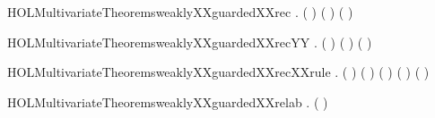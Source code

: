 \newcommand{\HOLMultivariateTheoremsweaklyXXguardedXXprefixXXrule}{\UseVerbatim{HOLMultivariateTheoremsweaklyXXguardedXXprefixXXrule}}
\begin{SaveVerbatim}{HOLMultivariateTheoremsweaklyXXguardedXXrec}
\HOLTokenTurnstile{} \HOLSymConst{\HOLTokenForall{}}  .
         (\HOLConst{\ensuremath{\mu}}  ) \HOLSymConst{\HOLTokenImp{}}
       \HOLSymConst{\HOLTokenNeg{}}   \HOLSymConst{\HOLTokenConj{}}  ( ) ( )
\end{SaveVerbatim}
\newcommand{\HOLMultivariateTheoremsweaklyXXguardedXXrec}{\UseVerbatim{HOLMultivariateTheoremsweaklyXXguardedXXrec}}
\begin{SaveVerbatim}{HOLMultivariateTheoremsweaklyXXguardedXXrecYY}
\HOLTokenTurnstile{} \HOLSymConst{\HOLTokenForall{}}  .
         (\HOLConst{\ensuremath{\mu}}  ) \HOLSymConst{\HOLTokenImp{}}
       \HOLSymConst{\HOLTokenNeg{}}   \HOLSymConst{\HOLTokenConj{}}  ( ) ( ) \HOLSymConst{\HOLTokenConj{}}
         
\end{SaveVerbatim}
\newcommand{\HOLMultivariateTheoremsweaklyXXguardedXXrecYY}{\UseVerbatim{HOLMultivariateTheoremsweaklyXXguardedXXrecYY}}
\begin{SaveVerbatim}{HOLMultivariateTheoremsweaklyXXguardedXXrecXXrule}
\HOLTokenTurnstile{} \HOLSymConst{\HOLTokenForall{}}  .
       \HOLSymConst{\HOLTokenNeg{}}   \HOLSymConst{\HOLTokenConj{}}  ( ) ( ) \HOLSymConst{\HOLTokenConj{}}
        ( ) ( ) \HOLSymConst{\HOLTokenImp{}}
         (\HOLConst{\ensuremath{\mu}}  )
\end{SaveVerbatim}
\newcommand{\HOLMultivariateTheoremsweaklyXXguardedXXrecXXrule}{\UseVerbatim{HOLMultivariateTheoremsweaklyXXguardedXXrecXXrule}}
\begin{SaveVerbatim}{HOLMultivariateTheoremsweaklyXXguardedXXrelab}
\HOLTokenTurnstile{} \HOLSymConst{\HOLTokenForall{}}  .
         (  ) \HOLSymConst{\HOLTokenImp{}}   
\end{SaveVerbatim}
